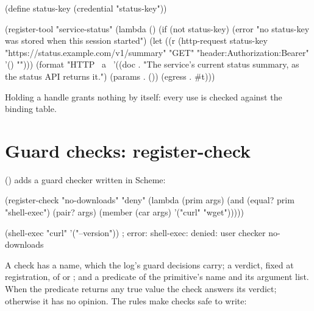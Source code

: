 \begin{scm}
(define status-key (credential "status-key"))

(register-tool "service-status"
  (lambda ()
    (if (not status-key)
        (error "no status-key was stored when this session started")
        (let ((r (http-request status-key "https://status.example.com/v1/summary"
                               "GET" "header:Authorization:Bearer" '() "")))
          (format "HTTP ~a~%
  '((doc . "The service's current status summary, as the status API returns it.")
    (params . ())
    (egress . #t)))
\end{scm}

Holding a handle grants nothing by itself: every use is checked against the
binding table.

\section{Guard checks: register-check}

 () adds a guard checker written in Scheme:

\begin{scm}
(register-check "no-downloads" "deny"
  (lambda (prim args)
    (and (equal? prim "shell-exec")
         (pair? args)
         (member (car args) '("curl" "wget")))))

(shell-exec "curl" '("--version"))   ; error: shell-exec: denied: user checker no-downloads
\end{scm}

A check has a name, which the log's guard decisions carry; a verdict, fixed
at registration, of  or ; and a predicate of the
primitive's name and its argument list. When the predicate returns any true
value the check answers its verdict; otherwise it has no opinion. The rules
make checks safe to write:

